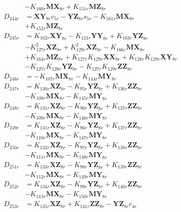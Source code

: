 \begin{align}
&- K_{160r}\mathbf{MX}_{8r} + K_{151r}\mathbf{MZ}_{8r} \nonumber \\
D_{244r} &= \mathbf{XY}_{8r}c_{5r} - \mathbf{YZ}_{8r}s_{5r} - K_{161r}\mathbf{MX}_{8r}  \nonumber \\
&+ K_{152r}\mathbf{MZ}_{8r} \nonumber \\
D_{245r} &= K_{162r}\mathbf{XY}_{8r} - K_{121r}\mathbf{YY}_{8r} + K_{163r}\mathbf{YZ}_{8r}  \nonumber \\
&- K_{127r}^2\mathbf{XZ}_{8r} + K_{129r}^2\mathbf{XZ}_{8r} - K_{166r}\mathbf{MX}_{8r}  \nonumber \\
&+ K_{164r}\mathbf{MZ}_{8r} + K_{127r}K_{129r}\mathbf{XX}_{8r} + K_{128r}K_{129r}\mathbf{XY}_{8r}  \nonumber \\
&- K_{127r}K_{128r}\mathbf{YZ}_{8r} - K_{127r}K_{129r}\mathbf{ZZ}_{8r} \nonumber \\
D_{246r} &= - K_{107r}\mathbf{MX}_{8r} - K_{144r}\mathbf{MY}_{8r} \nonumber \\
D_{247r} &= K_{130r}\mathbf{XZ}_{8r} - K_{95r}\mathbf{YZ}_{8r} + K_{136r}\mathbf{ZZ}_{8r}  \nonumber \\
&- K_{108r}\mathbf{MX}_{8r} - K_{145r}\mathbf{MY}_{8r} \nonumber \\
D_{248r} &= K_{131r}\mathbf{XZ}_{8r} - K_{96r}\mathbf{YZ}_{8r} + K_{137r}\mathbf{ZZ}_{8r}  \nonumber \\
&- K_{109r}\mathbf{MX}_{8r} - K_{146r}\mathbf{MY}_{8r} \nonumber \\
D_{249r} &= K_{131r}\mathbf{XZ}_{8r} - K_{96r}\mathbf{YZ}_{8r} + K_{137r}\mathbf{ZZ}_{8r}  \nonumber \\
&- K_{110r}\mathbf{MX}_{8r} - K_{147r}\mathbf{MY}_{8r} \nonumber \\
D_{250r} &= K_{132r}\mathbf{XZ}_{8r} - K_{97r}\mathbf{YZ}_{8r} + K_{138r}\mathbf{ZZ}_{8r}  \nonumber \\
&- K_{111r}\mathbf{MX}_{8r} - K_{148r}\mathbf{MY}_{8r} \nonumber \\
D_{251r} &= K_{133r}\mathbf{XZ}_{8r} - K_{98r}\mathbf{YZ}_{8r} + K_{139r}\mathbf{ZZ}_{8r}  \nonumber \\
&- K_{112r}\mathbf{MX}_{8r} - K_{149r}\mathbf{MY}_{8r} \nonumber \\
D_{252r} &= K_{134r}\mathbf{XZ}_{8r} - K_{99r}\mathbf{YZ}_{8r} + K_{140r}\mathbf{ZZ}_{8r}  \nonumber \\
&- K_{113r}\mathbf{MX}_{8r} - K_{150r}\mathbf{MY}_{8r} \nonumber \\
D_{253r} &= K_{135r}\mathbf{XZ}_{8r} + K_{141r}\mathbf{ZZ}_{8r} - \mathbf{YZ}_{8r}c_{4r}  \nonumber \\

\end{align}
